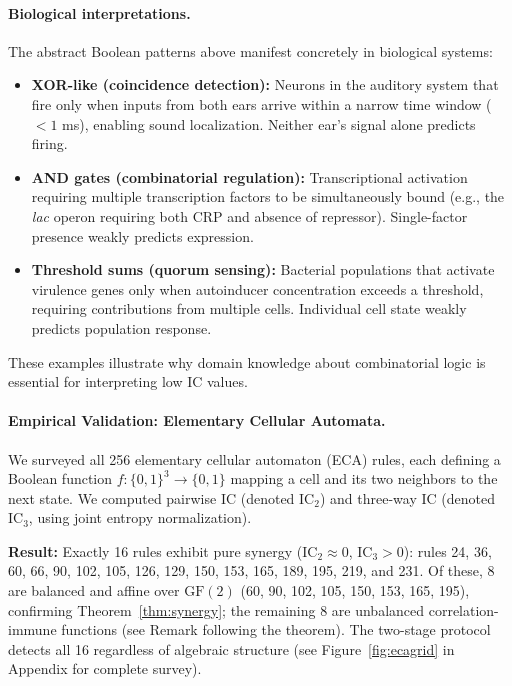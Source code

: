 \documentclass[10pt]{article} %
\theoremstyle{plain}
\theoremstyle{definition}
\newcommand{\IC}{\mathrm{IC}}  %
\begin{document}
\paragraph{Biological interpretations.} The abstract Boolean patterns above manifest concretely in biological systems:
\begin{itemize}
    \item \textbf{XOR-like (coincidence detection):} Neurons in the auditory system that fire only when inputs from both ears arrive within a narrow time window ($<1$ ms), enabling sound localization. Neither ear's signal alone predicts firing.
    \item \textbf{AND gates (combinatorial regulation):} Transcriptional activation requiring multiple transcription factors to be simultaneously bound (e.g., the \emph{lac} operon requiring both CRP and absence of repressor). Single-factor presence weakly predicts expression.
    \item \textbf{Threshold sums (quorum sensing):} Bacterial populations that activate virulence genes only when autoinducer concentration exceeds a threshold, requiring contributions from multiple cells. Individual cell state weakly predicts population response.
\end{itemize}
These examples illustrate why domain knowledge about combinatorial logic is essential for interpreting low IC values.

\paragraph{Empirical Validation: Elementary Cellular Automata.} We surveyed all 256 elementary cellular automaton (ECA) rules, each defining a Boolean function $f: \{0,1\}^3 \to \{0,1\}$ mapping a cell and its two neighbors to the next state. We computed pairwise IC (denoted $\text{IC}_2$) and three-way IC (denoted $\text{IC}_3$, using joint entropy normalization).

\textbf{Result:} Exactly 16 rules exhibit pure synergy ($\IC_2 \approx 0$, $\IC_3 > 0$): rules 24, 36, 60, 66, 90, 102, 105, 126, 129, 150, 153, 165, 189, 195, 219, and 231. Of these, 8 are balanced and affine over $\text{GF}(2)$ (60, 90, 102, 105, 150, 153, 165, 195), confirming Theorem~\ref{thm:synergy}; the remaining 8 are unbalanced correlation-immune functions (see Remark following the theorem). The two-stage protocol detects all 16 regardless of algebraic structure (see Figure~\ref{fig:ecagrid} in Appendix for complete survey).
\end{document}
